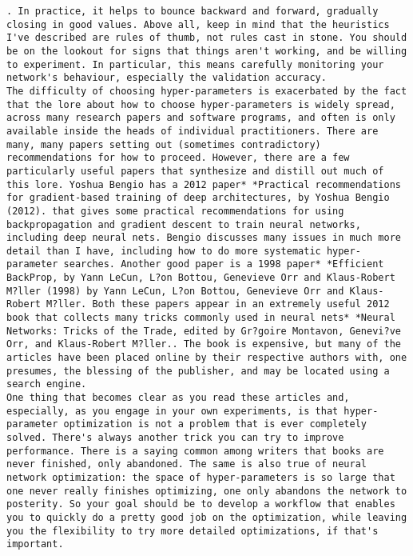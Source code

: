 \begin{lstlisting}
. In practice, it helps to bounce backward and forward, gradually closing in good values. Above all, keep in mind that the heuristics I've described are rules of thumb, not rules cast in stone. You should be on the lookout for signs that things aren't working, and be willing to experiment. In particular, this means carefully monitoring your network's behaviour, especially the validation accuracy.
The difficulty of choosing hyper-parameters is exacerbated by the fact that the lore about how to choose hyper-parameters is widely spread, across many research papers and software programs, and often is only available inside the heads of individual practitioners. There are many, many papers setting out (sometimes contradictory) recommendations for how to proceed. However, there are a few particularly useful papers that synthesize and distill out much of this lore. Yoshua Bengio has a 2012 paper* *Practical recommendations for gradient-based training of deep architectures, by Yoshua Bengio (2012). that gives some practical recommendations for using backpropagation and gradient descent to train neural networks, including deep neural nets. Bengio discusses many issues in much more detail than I have, including how to do more systematic hyper-parameter searches. Another good paper is a 1998 paper* *Efficient BackProp, by Yann LeCun, L?on Bottou, Genevieve Orr and Klaus-Robert M?ller (1998) by Yann LeCun, L?on Bottou, Genevieve Orr and Klaus-Robert M?ller. Both these papers appear in an extremely useful 2012 book that collects many tricks commonly used in neural nets* *Neural Networks: Tricks of the Trade, edited by Gr?goire Montavon, Genevi?ve Orr, and Klaus-Robert M?ller.. The book is expensive, but many of the articles have been placed online by their respective authors with, one presumes, the blessing of the publisher, and may be located using a search engine.
One thing that becomes clear as you read these articles and, especially, as you engage in your own experiments, is that hyper-parameter optimization is not a problem that is ever completely solved. There's always another trick you can try to improve performance. There is a saying common among writers that books are never finished, only abandoned. The same is also true of neural network optimization: the space of hyper-parameters is so large that one never really finishes optimizing, one only abandons the network to posterity. So your goal should be to develop a workflow that enables you to quickly do a pretty good job on the optimization, while leaving you the flexibility to try more detailed optimizations, if that's important.

\end{lstlisting}
